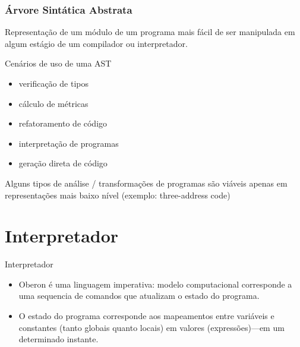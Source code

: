 \documentclass{beamer}
\begin{document}
\begin{frame}
  \frametitle{\'{A}rvore Sint\'{a}tica Abstrata}

  Representa\c c\~{a}o de um m\'{o}dulo de um
  programa mais f\'{a}cil de ser manipulada
  em algum est\'{a}gio de um compilador ou
  interpretador.

  \begin{block}{Cen\'{a}rios de uso de uma AST}
    \begin{itemize}
     \item verifica\c c\~{a}o de tipos
     \item c\'{a}lculo de m\'{e}tricas
     \item refatoramento de c\'{o}digo   
     \item interpreta\c c\~{a}o de programas
     \item gera\c c\~{a}o direta de c\'{o}digo  
    \end{itemize} 
  \end{block}  \pause

  Alguns tipos de an\'{a}lise / transforma\c c\~{o}es
  de programas s\~{a}o vi\'{a}veis apenas em
  representa\c c\~{o}es mais baixo n\'{i}vel
  (exemplo: three-address code)

\end{frame}

\section{Interpretador}

\begin{frame}
\huge{Interpretador}
\end{frame}

\begin{frame}
  \begin{itemize}
  \item Oberon \'{e} uma linguagem {\color{blue}imperativa}\pause: modelo
  computacional corresponde a uma sequencia de comandos
  que atualizam o {\color{blue}estado do programa}. \pause

  \item O estado do programa corresponde aos {\color{blue}mapeamentos} entre
  vari\'{a}veis e constantes (tanto globais quanto locais)
  em valores (express\~{o}es)\pause---em um determinado instante.
 \end{itemize} 
\end{frame}
\end{document}

